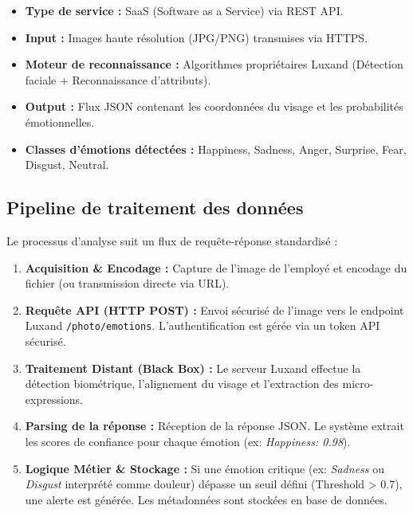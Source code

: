 \documentclass[a4paper,11pt]{report}
\begin{document}
\begin{itemize}
    \item \textbf{Type de service :} SaaS (Software as a Service) via REST API.
    \item \textbf{Input :} Images haute résolution (JPG/PNG) transmises via HTTPS.
    \item \textbf{Moteur de reconnaissance :} Algorithmes propriétaires Luxand (Détection faciale + Reconnaissance d'attributs).
    \item \textbf{Output :} Flux JSON contenant les coordonnées du visage et les probabilités émotionnelles.
    \item \textbf{Classes d'émotions détectées :} Happiness, Sadness, Anger, Surprise, Fear, Disgust, Neutral.
\end{itemize}

\subsection{Pipeline de traitement des données}
Le processus d'analyse suit un flux de requête-réponse standardisé :

\begin{enumerate}
    \item \textbf{Acquisition \& Encodage :} 
    Capture de l'image de l'employé et encodage du fichier (ou transmission directe via URL).
    
    \item \textbf{Requête API (HTTP POST) :} 
    Envoi sécurisé de l'image vers le endpoint Luxand \texttt{/photo/emotions}. L'authentification est gérée via un token API sécurisé.
    
    \item \textbf{Traitement Distant (Black Box) :} 
    Le serveur Luxand effectue la détection biométrique, l'alignement du visage et l'extraction des micro-expressions.
    
    \item \textbf{Parsing de la réponse :} 
    Réception de la réponse JSON. Le système extrait les scores de confiance pour chaque émotion (ex: \textit{Happiness: 0.98}).
    
    \item \textbf{Logique Métier & Stockage :} 
    Si une émotion critique (ex: \textit{Sadness} ou \textit{Disgust} interprété comme douleur) dépasse un seuil défini (Threshold > 0.7), une alerte est générée. Les métadonnées sont stockées en base de données.
\end{enumerate}
\end{document}
